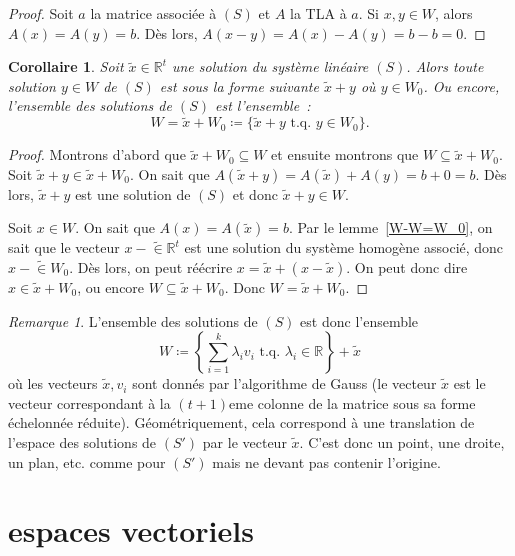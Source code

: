 \documentclass{article}
\newcommand{\R}{\mathbb R}
\newcommand{\tq}{\textrm{ t.q. }}
\newtheorem{cor}[thm]{Corollaire}
\theoremstyle{definition}
\theoremstyle{remark}
\newtheorem*{rmq}{Remarque}
\begin{document}
		\begin{proof} Soit $a$ la matrice associée à $(S)$ et $A$ la TLA à $a$. Si $x, y \in W$, alors $A(x) = A(y) = b$. Dès lors, $A(x-y) = A(x) - A(y) = b-b = 0$.
		\end{proof}

		\begin{cor} Soit $\widetilde x \in \R^t$ une solution du système linéaire $(S)$. Alors toute solution $y \in W$ de $(S)$ est sous la forme suivante
		$\widetilde x + y$ où $y \in W_0$. Ou encore, l'ensemble des solutions de $(S)$ est l'ensemble~:
		\[W = \widetilde x + W_0 \coloneqq \{\widetilde x + y \tq y \in W_0\}.\] \end{cor}

		\begin{proof} Montrons d'abord que $\widetilde x + W_0 \subseteq W$ et ensuite montrons que $W \subseteq \widetilde x + W_0$. Soit
		$\widetilde x + y \in \widetilde x + W_0$. On sait que $A(\widetilde x + y) = A(\widetilde x) + A(y) = b + 0 = b$. Dès lors, $\widetilde x + y$ est une
		solution de $(S)$ et donc $\widetilde x + y \in W$.

		Soit $x \in W$. On sait que $A(x) = A(\widetilde x) = b$. Par le lemme~\ref{W-W=W_0}, on sait que le vecteur $x-\widetilde \in \R^t$ est une solution du système
		homogène associé, donc $x-\widetilde \in W_0$. Dès lors, on peut réécrire $x = \widetilde x + (x-\widetilde x)$. On peut donc dire $x \in \widetilde x + W_0$, ou
		encore $W \subseteq \widetilde x + W_0$. Donc $W = \widetilde x + W_0$. \end{proof}

		\begin{rmq} L'ensemble des solutions de $(S)$ est donc l'ensemble \[W \coloneqq \left\{\sum_{i=1}^k\lambda_iv_i \tq \lambda_i \in \R\right\} + \widetilde x\] où
		les vecteurs $\widetilde x, v_i$ sont donnés par l'algorithme de Gauss (le vecteur $\widetilde x$ est le vecteur correspondant à la $(t+1)$eme colonne de
		la matrice sous sa forme échelonnée réduite). Géométriquement, cela correspond à une translation de l'espace des solutions de $(S')$ par le vecteur
		$\widetilde x$. C'est donc un point, une droite, un plan, etc. comme pour $(S')$ mais ne devant pas contenir l'origine. \end{rmq}

\newpage
\section{espaces vectoriels}
\end{document}
